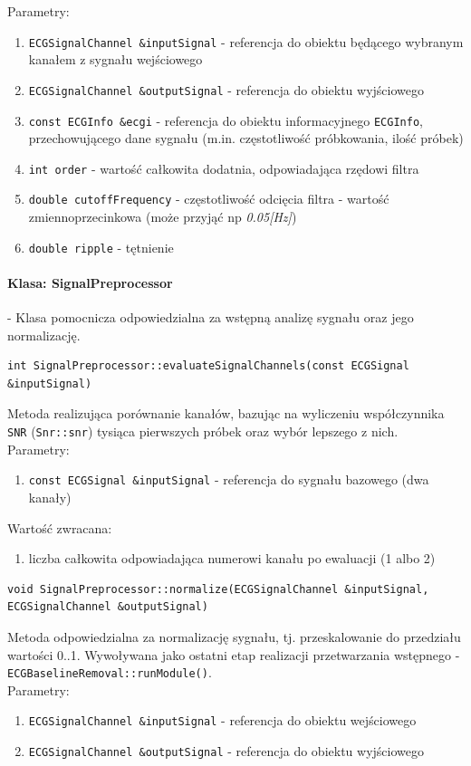 \documentclass[a4paper, 11pt]{article}
\begin{document}
Parametry:
\begin{enumerate}
\item \verb|ECGSignalChannel &inputSignal| - referencja do obiektu będącego wybranym kanałem z sygnału wejściowego
\item \verb|ECGSignalChannel &outputSignal| - referencja do obiektu wyjściowego
\item \verb|const ECGInfo &ecgi| - referencja do obiektu informacyjnego \verb|ECGInfo|, przechowującego dane sygnału (m.in. częstotliwość próbkowania, ilość próbek)
\item \verb|int order| - wartość całkowita dodatnia, odpowiadająca rzędowi filtra
\item \verb|double cutoffFrequency| - częstotliwość odcięcia filtra - wartość zmiennoprzecinkowa (może przyjąć np \textit{0.05[Hz]})
\item \verb|double ripple| - tętnienie 
\end{enumerate}

\paragraph{Klasa: SignalPreprocessor}
- Klasa pomocnicza odpowiedzialna za wstępną analizę sygnału oraz jego normalizację.

\begin{lstlisting}
int SignalPreprocessor::evaluateSignalChannels(const ECGSignal &inputSignal)
\end{lstlisting}
Metoda realizująca porównanie kanałów, bazując na wyliczeniu współczynnika \verb|SNR| (\verb|Snr::snr|) tysiąca pierwszych próbek oraz wybór lepszego z nich. \\

Parametry:
\begin{enumerate}
\item \verb|const ECGSignal &inputSignal| - referencja do sygnału bazowego (dwa kanały)
\end{enumerate}
Wartość zwracana:
\begin{enumerate}
\item liczba całkowita odpowiadająca numerowi kanału po ewaluacji (1 albo 2)
\end{enumerate} 

\begin{lstlisting}
void SignalPreprocessor::normalize(ECGSignalChannel &inputSignal, 
ECGSignalChannel &outputSignal)
\end{lstlisting}
Metoda odpowiedzialna za normalizację sygnału, tj. przeskalowanie do przedziału wartości 0..1. Wywoływana jako ostatni etap realizacji przetwarzania wstępnego - \verb|ECGBaselineRemoval::runModule()|.\\
Parametry:
\begin{enumerate}
\item \verb|ECGSignalChannel &inputSignal| - referencja do obiektu wejściowego
\item \verb|ECGSignalChannel &outputSignal| - referencja do obiektu wyjściowego
\end{enumerate}
\end{document}
